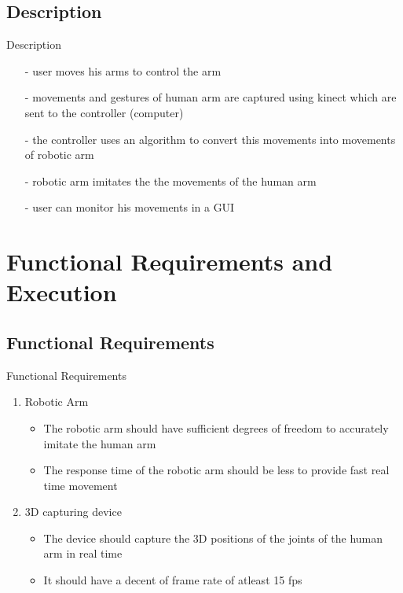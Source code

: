 \documentclass{beamer}
\begin{document}
\subsection{Description}
\begin{frame}{Description}
\begin{itemize}
\item[-]user moves his arms to control the arm
\item[-]movements and gestures of human arm are captured using kinect which are sent to the controller (computer)
\item[-]the controller uses an algorithm to convert this movements into movements of robotic arm
\item[-]robotic arm imitates the the movements of the human arm
\item[-]user can monitor his movements in a GUI
\end{itemize}
\end{frame}

\section{Functional Requirements and Execution}
\subsection{Functional Requirements}
\begin{frame}{Functional Requirements}
\begin{enumerate}
\item Robotic Arm
\begin{itemize}
\item The robotic arm should have sufficient degrees of freedom to accurately  imitate the human arm
\item The response time of the robotic arm should be less to provide fast real time movement
\end{itemize}
\item 3D capturing device
\begin{itemize}
\item The device should capture the 3D positions of the joints of the human arm in real time
\item It should have a decent of frame rate of atleast 15 fps
\end{itemize}
\end{enumerate}
\end{frame}   
\end{document}
